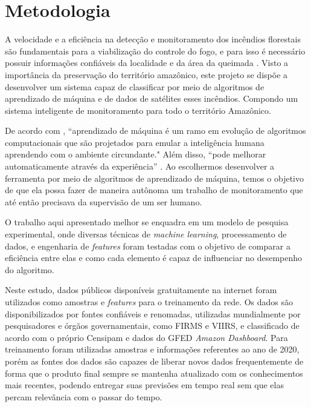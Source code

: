 \chapter{Metodologia}
\label{metodologia}

A velocidade e a eficiência na detecção e monitoramento dos incêndios florestais são 
fundamentais para a viabilização do controle do fogo, e para isso é necessário possuir informações confiáveis da localidade e da área da queimada \cite{batista}. Visto a importância da preservação do território amazônico, este projeto se dispõe a desenvolver um sistema capaz de classificar por meio de algoritmos de aprendizado de máquina e de dados de satélites esses incêndios. Compondo um sistema inteligente de monitoramento para todo o território Amazônico.

De acordo com \cite{naqa}, “aprendizado de máquina é um ramo em evolução de algoritmos computacionais que são projetados para emular a inteligência humana aprendendo com o ambiente circundante."  Além disso, “pode melhorar automaticamente através da experiência” \cite{coogan}. Ao escolhermos desenvolver a ferramenta por meio de algoritmos de aprendizado de máquina, temos o objetivo de que ela possa fazer de maneira autônoma um trabalho de monitoramento que até então precisava da supervisão de um ser humano. %

O trabalho aqui apresentado melhor se enquadra em um modelo de pesquisa experimental, onde diversas técnicas de \textit{machine learning}, processamento de dados, e engenharia de \textit{features} foram testadas com o objetivo de comparar a eficiência entre elas e como cada elemento é capaz de influenciar no desempenho do algoritmo.

Neste estudo, dados públicos disponíveis gratuitamente na internet foram utilizados como amostras e \textit{features} para o treinamento da rede. Os dados são disponibilizados por fontes confiáveis e renomadas, utilizadas mundialmente por pesquisadores e órgãos governamentais, como FIRMS e VIIRS, e classificado de acordo com o próprio Censipam e dados do GFED \textit{Amazon Dashboard}. Para treinamento foram utilizadas amostras e informações referentes ao ano de 2020, porém as fontes dos dados são capazes de liberar novos dados frequentemente de forma que o produto final sempre se mantenha atualizado com os conhecimentos mais recentes, podendo entregar suas previsões em tempo real sem que elas percam relevância com o passar do tempo.

